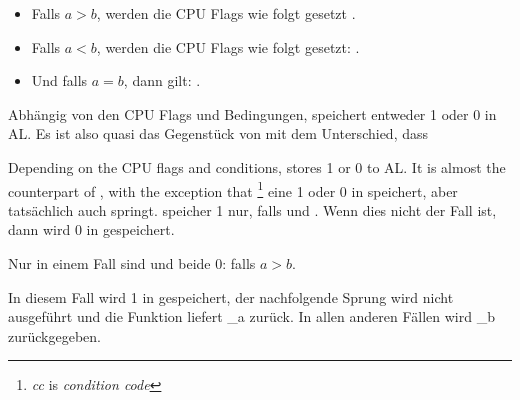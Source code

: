 \begin{itemize}
\item Falls $a>b$, werden die CPU Flags wie folgt gesetzt .
\item Falls $a<b$, werden die CPU Flags wie folgt gesetzt: .
\item Und falls $a=b$, dann gilt: .
\end{itemize}

Abhängig von den CPU Flags und Bedingungen, speichert \SETNBE entweder 1 oder 0
in AL.
Es ist also quasi das Gegenstück von \JNBE mit dem Unterschied, dass \SETcc

Depending on the CPU flags and conditions, \SETNBE stores 1 or 0 to AL. 
It is almost the counterpart of \JNBE, with the exception that \SETcc
\footnote{\emph{cc} is \emph{condition code}} eine 1 oder 0 in \AL speichert, aber
\Jcc tatsächlich auch springt.
\SETNBE speicher 1 nur, falls  und .
Wenn dies nicht der Fall ist, dann wird 0 in \AL gespeichert.

Nur in einem Fall sind \CF und \ZF beide 0: falls $a>b$.

In diesem Fall wird 1 in \AL gespeichert, der nachfolgende \JZ Sprung wird nicht
ausgeführt und die Funktion liefert {\_a} zurück. In allen anderen Fällen wird
{\_b} zurückgegeben.

